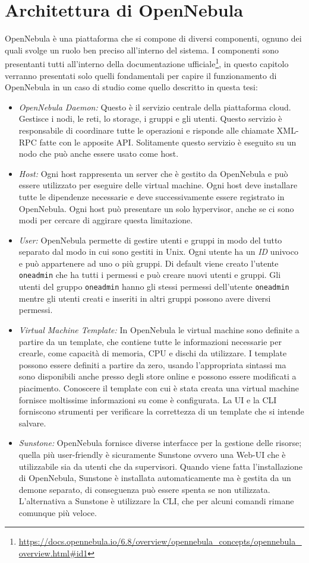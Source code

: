 \section{Architettura di OpenNebula}
OpenNebula è una piattaforma che si compone di diversi componenti, ognuno dei quali svolge un ruolo ben preciso all'interno del sistema. I componenti sono presentanti tutti all'interno della documentazione ufficiale\footnote{\url{https://docs.opennebula.io/6.8/overview/opennebula\_concepts/opennebula\_overview.html\#id1}}, in questo capitolo verranno presentati solo quelli fondamentali per capire il funzionamento di OpenNebula in un caso di studio come quello descritto in questa tesi:
\begin{itemize}
    \item \emph{OpenNebula Daemon:} Questo è il servizio centrale della piattaforma cloud. Gestisce i nodi, le reti, lo storage, i gruppi e gli utenti. Questo servizio è responsabile di coordinare tutte le operazioni e risponde alle chiamate XML-RPC fatte con le apposite API. Solitamente questo servizio è eseguito su un nodo che può anche essere usato come host.
    \item \emph{Host:} Ogni host rappresenta un server che è gestito da OpenNebula e può essere utilizzato per eseguire delle virtual machine. Ogni host deve installare tutte le dipendenze necessarie e deve successivamente essere registrato in OpenNebula. Ogni host può presentare un solo hypervisor, anche se ci sono modi per cercare di aggirare questa limitazione.
    \item  \emph{User:} OpenNebula permette di gestire utenti e gruppi in modo del tutto separato dal modo in cui sono gestiti in Unix. Ogni utente ha un \emph{ID} univoco e può appartenere ad uno o più gruppi. Di default viene creato l'utente \texttt{oneadmin} che ha tutti i permessi e può creare nuovi utenti e gruppi. Gli utenti del gruppo \texttt{oneadmin} hanno gli stessi permessi dell'utente \texttt{oneadmin} mentre gli utenti creati e inseriti in altri gruppi possono avere diversi permessi.
    \item \emph{Virtual Machine Template:} In OpenNebula le virtual machine sono definite a partire da un template, che contiene tutte le informazioni necessarie per crearle, come capacità di memoria, CPU e dischi da utilizzare. I template possono essere definiti a partire da zero, usando l'appropriata sintassi ma sono disponibili anche presso degli store online e possono essere modificati a piacimento. Conoscere il template con cui è stata creata una virtual machine fornisce moltissime informazioni su come è configurata. La UI e la CLI forniscono strumenti per verificare la correttezza di un template che si intende salvare.
    \item \emph{Sunstone:} OpenNebula fornisce diverse interfacce per la gestione delle risorse; quella più user-friendly è sicuramente Sunstone ovvero una Web-UI che è utilizzabile sia da utenti che da supervisori. Quando viene fatta l'installazione di OpenNebula, Sunstone è installata automaticamente ma è gestita da un demone separato, di conseguenza può essere spenta se non utilizzata. L'alternativa a Sunstone è utilizzare la CLI, che per alcuni comandi rimane comunque più veloce.
\end{itemize}
